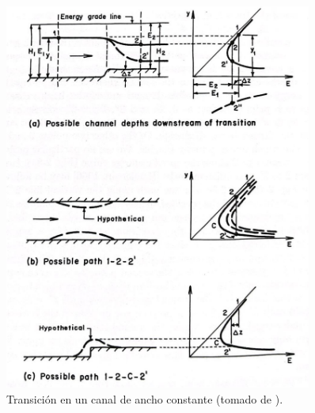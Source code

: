 \documentclass[11pt, oneside]{article}
\begin{document}
\begin{figure}[h]
\centering
\includegraphics[width=0.9\textwidth]{fig28.jpeg}
\caption{Transici\'on en un canal de ancho constante (tomado de \cite{Chau}).}
\label{fig12}
\end{figure}
\end{document}
